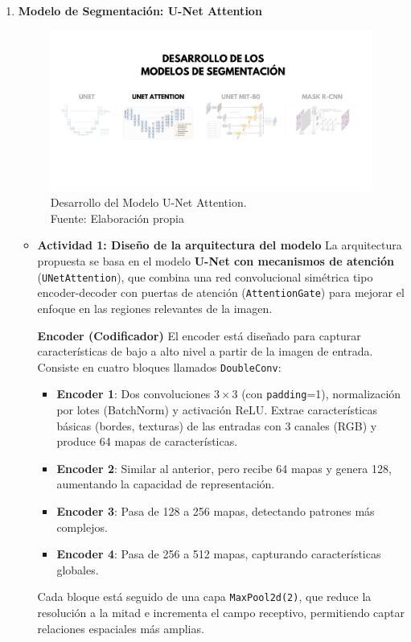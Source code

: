 \begin{enumerate}
\newpage
  \item \textbf{Modelo de Segmentación: U-Net Attention}
  \begin{figure}[H]
	\begin{center}
		\includegraphics[width=1\textwidth]{4/figures/desunetat.png}
		\caption[Desarrollo del Modelo U-Net Attention]{Desarrollo del Modelo U-Net Attention.\\
		Fuente: Elaboración propia}
		\label{4:figdesunetat}
	\end{center}
\end{figure}
  \begin{itemize}


  \item\textbf{Actividad 1: Diseño de la arquitectura del modelo}
  La arquitectura propuesta se basa en el modelo \textbf{U-Net con mecanismos de atención} (\texttt{UNetAttention}), que combina una red convolucional simétrica tipo encoder-decoder con puertas de atención (\texttt{AttentionGate}) para mejorar el enfoque en las regiones relevantes de la imagen.

\textbf{Encoder (Codificador)}
El encoder está diseñado para capturar características de bajo a alto nivel a partir de la imagen de entrada. Consiste en cuatro bloques llamados \texttt{DoubleConv}:
\begin{itemize}
    \item \textbf{Encoder 1}: Dos convoluciones $3\times3$ (con \texttt{padding}=1), normalización por lotes (BatchNorm) y activación ReLU. Extrae características básicas (bordes, texturas) de las entradas con 3 canales (RGB) y produce 64 mapas de características.
    \item \textbf{Encoder 2}: Similar al anterior, pero recibe 64 mapas y genera 128, aumentando la capacidad de representación.
    \item \textbf{Encoder 3}: Pasa de 128 a 256 mapas, detectando patrones más complejos.
    \item \textbf{Encoder 4}: Pasa de 256 a 512 mapas, capturando características globales.
\end{itemize}
Cada bloque está seguido de una capa \texttt{MaxPool2d(2)}, que reduce la resolución a la mitad e incrementa el campo receptivo, permitiendo captar relaciones espaciales más amplias.


\end{itemize}
\end{enumerate}
